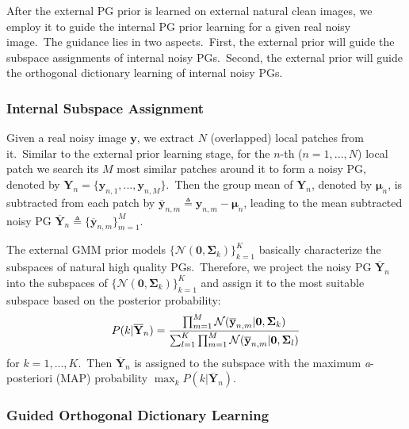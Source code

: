 \documentclass[10pt,twocolumn,letterpaper]{article}
\begin{document}
After the external PG prior is learned on external natural clean images, we employ it to guide the internal PG prior learning for a given real noisy image.\ The guidance lies in two aspects.\ First, the external prior will guide the subspace assignments of internal noisy PGs.\ Second, the external prior will guide the orthogonal dictionary learning of internal noisy PGs.

\vspace{-2mm}
\subsubsection{Internal Subspace Assignment}

Given a real noisy image $\mathbf{y}$, we extract $N$ (overlapped) local patches from it.\ Similar to the external prior learning stage, for the $n$-th ($n=1,...,N$) local patch we search its $M$ most similar patches around it to form a noisy PG, denoted by $\mathbf{Y}_{n} = \{\mathbf{y}_{n,1},...,\mathbf{y}_{n,M}\}$.\ Then the group mean of $\mathbf{Y}_{n}$, denoted by $\bm{\mu}_{n}$, is subtracted from each patch by $\mathbf{\overline{y}}_{n,m}\triangleq\mathbf{y}_{n,m}-\bm{\mu}_{n}$, leading to the mean subtracted noisy PG $\mathbf{\overline{Y}}_{n}\triangleq \{\mathbf{\overline{y}}_{n,m}\}_{m=1}^{M}$.

The external GMM prior models $\{\mathcal{N}(\mathbf{0},\mathbf{\Sigma}_{k})\}_{k=1}^{K}$ basically characterize the subspaces of natural high quality PGs.\ Therefore, we project the noisy PG $\mathbf{\overline{Y}}_{n}$ into the subspaces of $\{\mathcal{N}(\mathbf{0},\mathbf{\Sigma}_{k})\}_{k=1}^{K}$ and assign it to the most suitable subspace based on the posterior probability:
\vspace{-3mm}
\begin{equation}\label{equ3}\vspace{-2mm}
P(k|\mathbf{\overline{Y}}_{n})=\frac{\prod_{m=1}^{M}\mathcal{N}(\mathbf{\overline{y}}_{n,m}|\mathbf{0},\mathbf{\Sigma}_{k})}{\sum_{l=1}^{K}\prod_{m=1}^{M}\mathcal{N}(\mathbf{\overline{y}}_{n,m}|\mathbf{0},\mathbf{\Sigma}_{l})}
\end{equation}
for $k=1,...,K$.\ Then $\mathbf{\overline{Y}}_{n}$ is assigned to the subspace with the maximum \emph{a}-posteriori (MAP) probability $\max_{k}P(k|\mathbf{\overline{Y}}_{n})$.

\vspace{-3mm}
\subsubsection{Guided Orthogonal Dictionary Learning}
\end{document}
